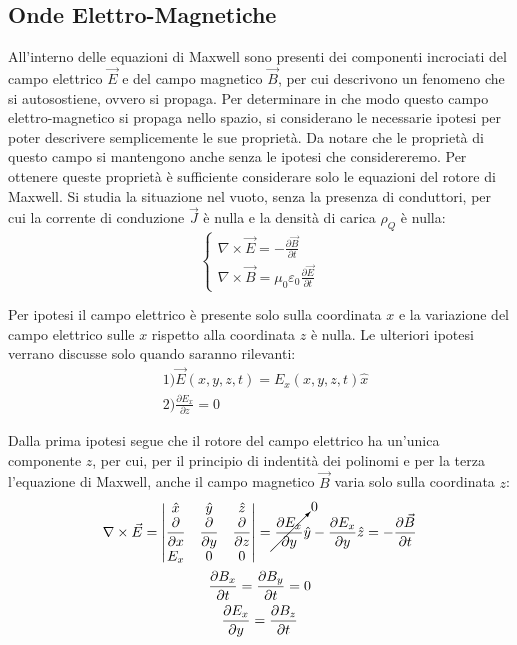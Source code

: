 \documentclass{article}
\numberwithin{equation}{subsection}
\begin{document}
\subsection{Onde Elettro-Magnetiche}
All'interno delle equazioni di Maxwell sono presenti dei componenti incrociati del campo elettrico $\vec{E}$ e del campo magnetico $\vec{B}$, per cui descrivono un fenomeno 
che si autosostiene, ovvero si propaga. Per determinare in che modo questo campo elettro-magnetico si propaga nello spazio, si considerano le necessarie ipotesi per poter 
descrivere semplicemente le sue proprietà. Da notare che le proprietà di questo campo si mantengono anche senza le ipotesi che considereremo. Per ottenere queste proprietà 
è sufficiente considerare solo le equazioni del rotore di Maxwell. Si studia la situazione nel vuoto, senza la presenza di conduttori, per cui la corrente di conduzione $\vec{J}$ 
è nulla e la densità di carica $\rho_Q$ è nulla: 
\begin{equation*}
    \begin{cases}
        \nabla\times\vec{E}=-\displaystyle\frac{\partial \vec{B}}{\partial t}\\
        \nabla\times\vec{B}=\mu_0\varepsilon_0\displaystyle\frac{\partial \vec{E}}{\partial t}
    \end{cases}
\end{equation*}

Per ipotesi il campo elettrico è presente solo sulla coordinata $x$ e la variazione del campo elettrico sulle $x$ rispetto alla coordinata $z$ è nulla. Le ulteriori ipotesi 
verrano discusse solo quando saranno rilevanti:
\begin{align*}
    &1)\vec{E}(x,y,z,t)=E_x(x,y,z,t)\hat{x}\\
    &2)\displaystyle\frac{\partial E_x}{\partial z}=0
\end{align*}

Dalla prima ipotesi segue che il rotore del campo elettrico ha un'unica componente $z$, per cui, per il principio di indentità dei polinomi e per la terza l'equazione di Maxwell, 
anche il campo magnetico $\vec{B}$ varia solo sulla coordinata $z$: 
\begin{gather*}
    \nabla\times\vec{E}=
    \begin{vmatrix}
        \hat{x} &\hat{y}&\hat{z}\\
        \displaystyle\frac{\partial}{\partial x}&\displaystyle\frac{\partial}{\partial y}&\displaystyle\frac{\partial}{\partial z}\\
        E_x&0&0
    \end{vmatrix}=
    \displaystyle\cancelto{0}{\frac{\partial E_x}{\partial y}}\hat{y}-\frac{\partial E_x}{\partial y}\hat{z}=-\frac{\partial \vec{B}}{\partial t}\\
    \displaystyle\frac{\partial B_x}{\partial t}=\frac{\partial B_y}{\partial t}=0\\
    \displaystyle\frac{\partial E_x}{\partial y}=\frac{\partial B_z}{\partial t}
\end{gather*}
\end{document}

